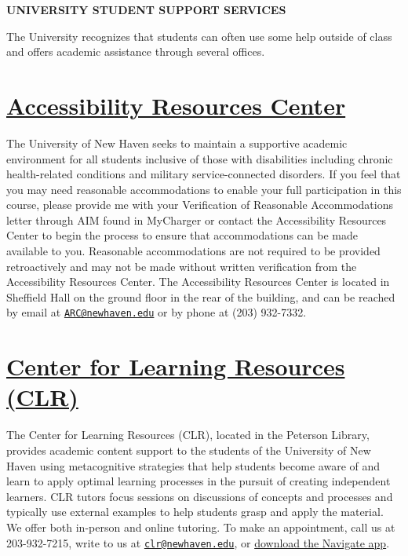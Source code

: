 \documentclass[11pt,]{article}
\begin{document}
\begin{center} 
\bfseries{\Large{\textcolor{unhtext}{UNIVERSITY STUDENT SUPPORT SERVICES}}}
\end{center}

The University recognizes that students can often use some help outside
of class and offers academic assistance through several offices.

\hypertarget{accessibility-resources-center}{%
\section{\texorpdfstring{\href{https://mycharger.newhaven.edu/web/mycharger/accessibility-resources-center}{Accessibility
Resources
Center}}{Accessibility Resources Center}}\label{accessibility-resources-center}}

The University of New Haven seeks to maintain a supportive academic
environment for all students inclusive of those with disabilities
including chronic health-related conditions and military
service-connected disorders. If you feel that you may need reasonable
accommodations to enable your full participation in this course, please
provide me with your Verification of Reasonable Accommodations letter
through AIM found in MyCharger or contact the Accessibility Resources
Center to begin the process to ensure that accommodations can be made
available to you. Reasonable accommodations are not required to be
provided retroactively and may not be made without written verification
from the Accessibility Resources Center. The Accessibility Resources
Center is located in Sheffield Hall on the ground floor in the rear of
the building, and can be reached by email at
\href{mailto:ARC@newhaven.edu}{\nolinkurl{ARC@newhaven.edu}} or by phone
at (203) 932-7332.

\hypertarget{center-for-learning-resources-clr}{%
\section{\texorpdfstring{\href{https://mycharger.newhaven.edu/web/mycharger/center-for-learning-resources}{Center
for Learning Resources
(CLR)}}{Center for Learning Resources (CLR)}}\label{center-for-learning-resources-clr}}

The Center for Learning Resources (CLR), located in the Peterson
Library, provides academic content support to the students of the
University of New Haven using metacognitive strategies that help
students become aware of and learn to apply optimal learning processes
in the pursuit of creating independent learners. CLR tutors focus
sessions on discussions of concepts and processes and typically use
external examples to help students grasp and apply the material. We
offer both in-person and online tutoring. To make an appointment, call
us at 203-932-7215, write to us at
\href{mailto:clr@newhaven.edu}{\nolinkurl{clr@newhaven.edu}}, or
\href{https://mycharger.newhaven.edu/documents/10354/0/CLR+Student+Appointment1.pdf/85d9dd6f-6765-4f0c-809b-c0dc47ad3b12}{download
the Navigate app}.
\end{document}
